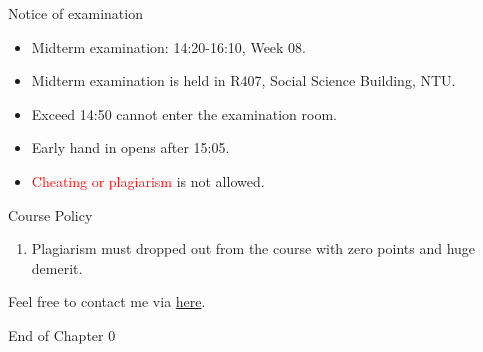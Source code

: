 \documentclass{beamer}
\begin{document}
\begin{frame}{Notice of examination}
\begin{itemize}
\item Midterm examination: 14:20-16:10, Week 08.
\item Midterm examination is held in R407, Social Science Building, NTU.
\item Exceed 14:50 cannot enter the examination room.
\item Early hand in opens after 15:05.
\item \textcolor{red}{Cheating or plagiarism} is not allowed.
\end{itemize}
\end{frame}
\begin{frame}{Course Policy}
\begin{enumerate}
\item Plagiarism must dropped out from the course with zero points and huge demerit. \\
\end{enumerate}
\end{frame}
\begin{frame}{}
\begin{center}
\Large{Feel free to contact me via \href{mailto:politics.tchsiao@gmail.com}{here}.}
\end{center}
\end{frame}
\begin{frame}{}
\begin{center}
\Large{End of Chapter 0}
\end{center}
\end{frame}
\end{document}
